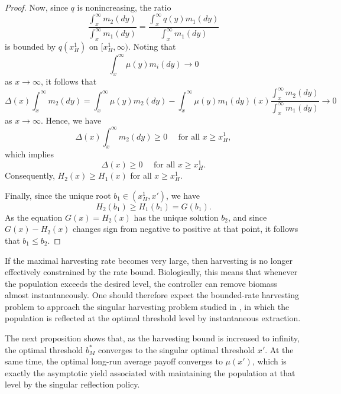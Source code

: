\documentclass[12pt]{article}
\begin{document}
\begin{proof}
    Now, since $q$ is nonincreasing, the ratio 
    \begin{equation*}
        \frac{\int_x^\infty m_{2}(dy)}{\int_x^\infty m_{1}(dy)}
        =\frac{\int_x^\infty q(y)m_{1}(dy)}{\int_x^\infty m_{1}(dy)}
    \end{equation*}
    is bounded by $q(x_H^1)$ on $[x_H^1, \infty)$. Noting that 
    \[\int_x^\infty \mu(y)m_{i}(dy) \to 0\] 
    as $x \to \infty$, it follows that
    \begin{equation*}
        \Delta(x)\int_x^\infty m_{2}(dy) = 
        \int_x^\infty \mu(y)m_{2}(dy)-\int_x^\infty \mu(y)m_{1}(dy)(x)\frac{\int_x^\infty m_{2}(dy)}{\int_x^\infty m_{1}(dy)} \to 0
    \end{equation*}
    as $x \to \infty$. Hence, we have 
    \begin{equation*}
        \Delta(x) \int_x^\infty m_{2}(dy) \geq 0 \quad \text{ for all } x \geq x_H^1,
    \end{equation*}
    which implies
    \begin{equation*}
        \Delta(x) \geq 0 \quad \text{ for all } x \geq x_H^1.
    \end{equation*}
    Consequently, $H_2(x) \geq H_1(x)$ for all $ x \geq x_H^1$.
    
    Finally, since the unique root $b_1 \in (x_H^1,x')$, we have 
    \begin{equation*}
        H_2(b_1) \geq H_1(b_1) = G(b_1).
    \end{equation*}
    As the equation $G(x) = H_2(x)$ has the unique solution $b_2$, and since $G(x)-H_2(x)$ changes sign from negative to positive at that point, it follows that $b_1 \le b_2.$
\end{proof}

If the maximal harvesting rate becomes very large, then harvesting is no longer effectively constrained by the rate bound. Biologically, this means that whenever the population exceeds the desired level, the controller can remove biomass almost instantaneously. One should therefore expect the bounded-rate harvesting problem to approach the singular harvesting problem studied in \cite{Alvarez2018}, in which the population is reflected at the optimal threshold level by instantaneous extraction.

The next proposition shows that, as the harvesting bound is increased to infinity, the optimal threshold $b_M^*$ converges to the singular optimal threshold $x'$. At the same time, the optimal long-run average payoff converges to $\mu(x')$, which is exactly the asymptotic yield associated with maintaining the population at that level by the singular reflection policy.
\end{document}
